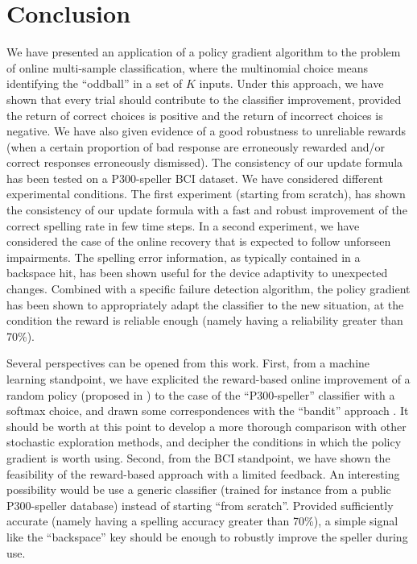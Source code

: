 \documentclass[conference]{IEEEtran}
\begin{document}
\section{Conclusion}

We have presented an application of a policy gradient algorithm 
to the problem of online multi-sample classification, where the multinomial choice means identifying 
the ``oddball'' in a set of $K$ inputs. 
Under this approach, we have shown that every trial should contribute to the classifier improvement, 
provided the return of correct choices is positive and the return of incorrect choices is negative.
We have also given evidence of a good robustness to unreliable rewards 
(when a certain proportion of bad response are erroneously rewarded and/or correct responses 
erroneously dismissed). 
The consistency of our update formula 
has been tested on a P300-speller BCI dataset.
We have considered different experimental conditions. The first experiment (starting from scratch),
has shown the consistency of our update formula with a fast and robust improvement of the 
correct spelling rate in few time steps.
In a second experiment, we have considered the case of the online recovery that is expected to follow 
unforseen impairments. 
The spelling error information, as typically contained in a backspace hit, has been shown useful for the device adaptivity to unexpected changes. 
Combined with a specific failure detection algorithm, the policy gradient has been shown to appropriately
adapt the classifier to the new situation, at the condition 
the reward is reliable enough (namely having a reliability greater than 70\%).


Several perspectives can be opened from this work. First, from a machine learning standpoint, we have
explicited the reward-based online improvement of a random policy (proposed in \cite{Wil92}) to the case of the ``P300-speller'' classifier
with a softmax choice, and drawn 
some correspondences with the ``bandit'' approach \cite{Auer02}. It should be worth at this point to develop a
more thorough comparison with other stochastic exploration methods, and decipher the conditions in which the policy gradient 
is worth using. 
Second, from the BCI standpoint, we have shown the feasibility 
of the reward-based approach with a limited feedback.
An interesting possibility would be use a generic classifier (trained for instance from a public P300-speller database) instead of starting
``from scratch''. Provided sufficiently accurate (namely having a spelling accuracy greater than 70\%), a
simple signal like the ``backspace'' key should be enough to robustly improve the speller during use.  
\end{document}

